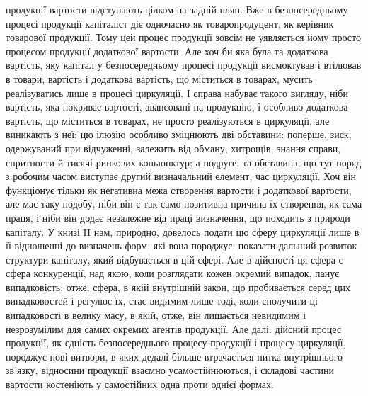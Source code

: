 \parcont{}  %
продукції вартости відступають цілком на задній плян. Вже в безпосередньому
процесі продукції капіталіст діє одночасно як товаропродуцент, як керівник
товарової продукції. Тому цей процес продукції зовсім не уявляється йому просто
процесом продукції додаткової вартости. Але хоч би яка була та додаткова
вартість, яку капітал у безпосередньому процесі продукції висмоктував і втілював
в товари, вартість і додаткова вартість, що міститься в товарах, мусить реалізуватись
лише в процесі циркуляції. І справа набуває такого вигляду, ніби вартість,
яка покриває вартості, авансовані на продукцію, і особливо додаткова
вартість, що міститься в товарах, не просто реалізуються в циркуляції, але виникають
з неї; цю ілюзію особливо зміцнюють дві обставини: поперше, зиск,
одержуваний при відчуженні, залежить від обману, хитрощів, знання справи,
спритности й тисячі ринкових коньюнктур; а подруге, та обставина, що тут
поряд з робочим часом виступає другий визначальний елемент, час циркуляції.
Хоч він функціонує тільки як негативна межа створення вартости і додаткової
вартости, але має таку подобу, ніби він є так само позитивна причина
їх створення, як сама праця, і ніби він додає незалежне від праці визначення,
що походить з природи капіталу. У книзі II нам, природно, довелось подати цю
сферу циркуляції лише в її відношенні до визначень форм, які вона породжує,
показати дальший розвиток структури капіталу, який відбувається в цій сфері.
Але в дійсності ця сфера є сфера конкуренції, над якою, коли розглядати кожен
окремий випадок, панує випадковість; отже, сфера, в якій внутрішній закон,
що пробивається серед цих випадковостей і регулює їх, стає видимим лише тоді,
коли сполучити ці випадковості в велику масу, в якій, отже, він лишається
невидимим і незрозумілим для самих окремих агентів продукції. Але далі: дійсний
процес продукції, як єдність безпосереднього процесу продукції і процесу
циркуляції, породжує нові витвори, в яких дедалі більше втрачається нитка
внутрішнього зв’язку, відносини продукції взаємно усамостійнюються, і складові
частини вартости костеніють у самостійних одна проти однієї формах.

